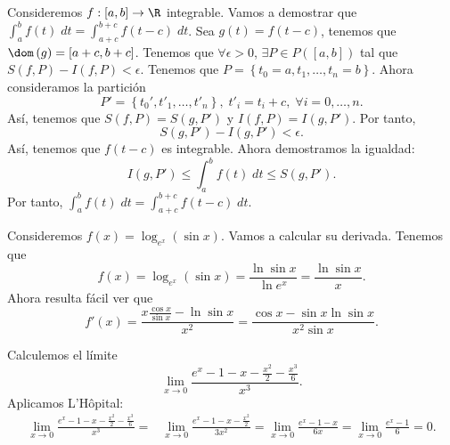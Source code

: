\begin{eg}
	\normalfont Consideremos $\displaystyle f : \left[a,b\right] \to \R $ integrable. Vamos a demostrar que $\displaystyle \int^{b}_{a} f\left(t\right) \; dt = \int^{b+c}_{a + c} f\left(t-c\right) \; dt $. Sea $\displaystyle g\left(t\right) = f\left(t-c\right) $, tenemos que $\displaystyle \dom\left(g\right) = \left[a+c, b + c\right]  $. Tenemos que $\displaystyle \forall \epsilon > 0 $, $\displaystyle \exists P \in P\left(\left[a,b\right] \right) $ tal que $\displaystyle S\left(f,P\right)-I\left(f,P\right) < \epsilon  $. Tenemos que $\displaystyle P = \left\{ t_{0}=a, t_{1}, \ldots, t_{n} =b\right\}  $. Ahora consideramos la partición
	\[ P' = \left\{ t_{0}', t'_{1}, \ldots, t'_{n}\right\}, \; t'_{i} = t_{i} +c, \; \forall i = 0, \ldots, n  .\]
	Así, tenemos que $\displaystyle S\left(f,P\right)=S\left(g,P'\right) $ y $\displaystyle I\left(f,P\right) = I\left(g,P'\right) $. Por tanto, 
	\[S\left(g,P'\right)-I\left(g,P'\right) < \epsilon  .\]
Así, tenemos que $\displaystyle f\left(t-c\right) $ es integrable. Ahora demostramos la igualdad:
\[I\left(g,P'\right) \leq \int^{b}_{a} f\left(t\right) \; dt \leq S\left(g,P'\right) .\]
Por tanto, $\displaystyle \int^{b}_{a} f\left(t\right) \; dt = \int^{b + c}_{a+c} f\left(t-c\right) \; dt $.
\end{eg}
\begin{eg}
\normalfont Consideremos $\displaystyle f\left(x\right) = \log_{e^{x}}\left(\sin x\right) $. Vamos a calcular su derivada. Tenemos que 
\[f\left(x\right) = \log_{e^{x}}\left(\sin x\right) = \frac{\ln \sin x}{\ln e^{x}} = \frac{\ln \sin x}{x} .\]
Ahora resulta fácil ver que 
\[f'\left(x\right) = \frac{x\frac{\cos x}{\sin x}- \ln \sin x}{x^{2}} = \frac{\cos x - \sin x \ln \sin x}{x^{2}\sin x} .\]
\end{eg}
\begin{eg}
\normalfont Calculemos el límite
\[ \lim_{x \to 0}\frac{e^{x}-1-x-\frac{x^{2}}{2}-\frac{x^{3}}{6}}{x^{3}} .\]
Aplicamos L'Hôpital:
\[
\begin{split}
	\lim_{x \to 0}\frac{e^{x}-1-x-\frac{x^{2}}{2}-\frac{x^{3}}{6}}{x^{3}} = & \lim_{x \to 0}\frac{e^{x}-1-x-\frac{x^{2}}{2}}{3x^{2}} = \lim_{x \to 0}\frac{e^{x}-1-x}{6x} = \lim_{x \to 0}\frac{e^{x}-1}{6} = 0.
\end{split}
\]
\end{eg}
